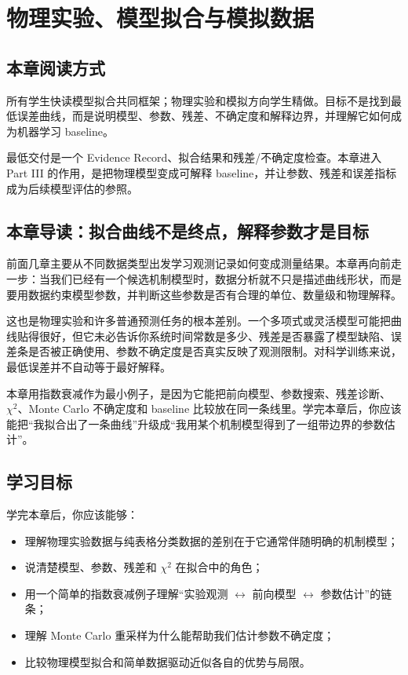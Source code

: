 \chapter{物理实验、模型拟合与模拟数据}

\section{本章阅读方式}

所有学生快读模型拟合共同框架；物理实验和模拟方向学生精做。目标不是找到最低误差曲线，而是说明模型、参数、残差、不确定度和解释边界，并理解它如何成为机器学习 baseline。

最低交付是一个 Evidence Record、拟合结果和残差/不确定度检查。本章进入 Part III 的作用，是把物理模型变成可解释 baseline，并让参数、残差和误差指标成为后续模型评估的参照。

\section{本章导读：拟合曲线不是终点，解释参数才是目标}

前面几章主要从不同数据类型出发学习观测记录如何变成测量结果。本章再向前走一步：当我们已经有一个候选机制模型时，数据分析就不只是描述曲线形状，而是要用数据约束模型参数，并判断这些参数是否有合理的单位、数量级和物理解释。

这也是物理实验和许多普通预测任务的根本差别。一个多项式或灵活模型可能把曲线贴得很好，但它未必告诉你系统时间常数是多少、残差是否暴露了模型缺陷、误差条是否被正确使用、参数不确定度是否真实反映了观测限制。对科学训练来说，最低误差并不自动等于最好解释。

本章用指数衰减作为最小例子，是因为它能把前向模型、参数搜索、残差诊断、\(\chi^2\)、Monte Carlo 不确定度和 baseline 比较放在同一条线里。学完本章后，你应该能把“我拟合出了一条曲线”升级成“我用某个机制模型得到了一组带边界的参数估计”。

\section{学习目标}

学完本章后，你应该能够：

\begin{itemize}
    \item 理解物理实验数据与纯表格分类数据的差别在于它通常伴随明确的机制模型；
    \item 说清楚模型、参数、残差和 $\chi^2$ 在拟合中的角色；
    \item 用一个简单的指数衰减例子理解“实验观测 $\leftrightarrow$ 前向模型 $\leftrightarrow$ 参数估计”的链条；
    \item 理解 Monte Carlo 重采样为什么能帮助我们估计参数不确定度；
    \item 比较物理模型拟合和简单数据驱动近似各自的优势与局限。
\end{itemize}


